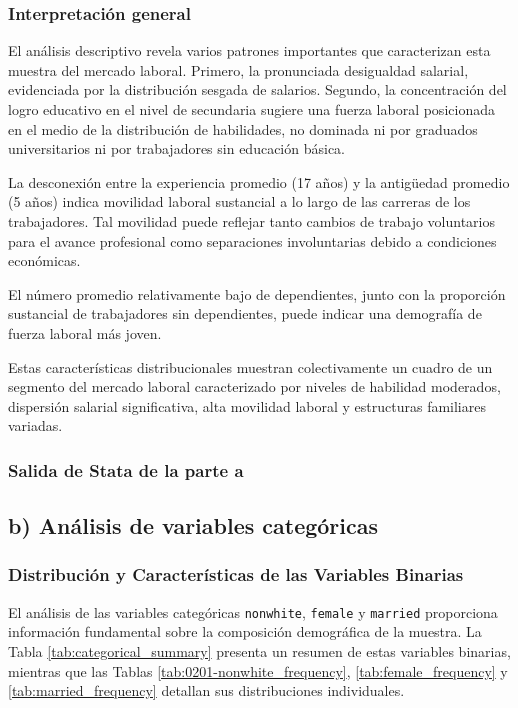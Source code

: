 \documentclass[12pt]{article}
\begin{document}
\subsubsection*{Interpretación general}

El análisis descriptivo revela varios patrones importantes que caracterizan esta muestra del mercado laboral. Primero, la pronunciada desigualdad salarial, evidenciada por la distribución sesgada de salarios. Segundo, la concentración del logro educativo en el nivel de secundaria sugiere una fuerza laboral posicionada en el medio de la distribución de habilidades, no dominada ni por graduados universitarios ni por trabajadores sin educación básica.

La desconexión entre la experiencia promedio (17 años) y la antigüedad promedio (5 años) indica movilidad laboral sustancial a lo largo de las carreras de los trabajadores. Tal movilidad puede reflejar tanto cambios de trabajo voluntarios para el avance profesional como separaciones involuntarias debido a condiciones económicas.

El número promedio relativamente bajo de dependientes, junto con la proporción sustancial de trabajadores sin dependientes, puede indicar una demografía de fuerza laboral más joven.

Estas características distribucionales muestran colectivamente un cuadro de un segmento del mercado laboral caracterizado por niveles de habilidad moderados, dispersión salarial significativa, alta movilidad laboral y estructuras familiares variadas.

\subsubsection*{Salida de Stata de la parte a}

%

\subsection*{b) Análisis de variables categóricas}

\subsubsection*{Distribución y Características de las Variables Binarias}

El análisis de las variables categóricas \texttt{nonwhite}, \texttt{female} y \texttt{married} proporciona información fundamental sobre la composición demográfica de la muestra. La Tabla \ref{tab:categorical_summary} presenta un resumen de estas variables binarias, mientras que las Tablas \ref{tab:0201-nonwhite_frequency}, \ref{tab:female_frequency} y \ref{tab:married_frequency} detallan sus distribuciones individuales.
\end{document}
